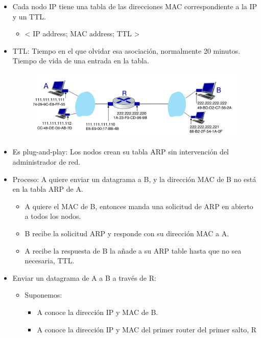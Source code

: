 \documentclass[12pt, twoside, openright]{report} %
\begin{document}
\begin{itemize}
	      \begin{itemize}
		      \item Cada nodo IP tiene una tabla de las direcciones MAC
		            correspondiente a la IP y un TTL.
		            \begin{itemize}
			            \item \textless{} IP address; MAC address; TTL \textgreater{}
		            \end{itemize}
		      \item TTL: Tiempo en el que olvidar esa asociación, normalmente 20 minutos.
		            Tiempo de vida de una entrada en la tabla.
		            \begin{figure}[H]
			            {\includegraphics[scale=.25]{Untitled 57.png}}
		            \end{figure}
		      \item Es plug-and-play: Los nodos crean su tabla ARP sin intervención del administrador de red.
		      \item Proceso: A quiere enviar un datagrama a B, y la dirección MAC de B no está en la tabla ARP de A.
		            \begin{itemize}
			            \item A quiere el MAC de B, entonces manda una solicitud de ARP en abierto a todos los nodos.
			            \item B recibe la solicitud ARP y responde con su dirección MAC a A.
			            \item A recibe la respuesta de B la añade a su ARP table hasta que no sea necesaria, TTL.
		            \end{itemize}
		      \item Enviar un datagrama de A a B a través de R:
		            \begin{itemize}
			            \item Suponemos:
			                  \begin{itemize}
				                  \item A conoce la dirección IP y MAC de B.
				                  \item A conoce la dirección IP y MAC del primer router del primer salto, R
			                  \end{itemize}


\end{itemize}
\end{itemize}
\end{itemize}
\end{document}
